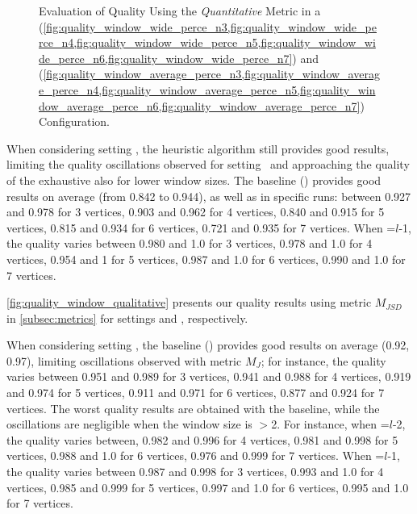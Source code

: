 \begin{figure}[H]
\begin{adjustbox}{minipage=\linewidth,scale=0.75}
\begin{subfigure}{0.45\textwidth}
        \end{subfigure}

        \caption{Evaluation of Quality Using the \emph{Quantitative} Metric in a \wide (\cref{fig:quality_window_wide_perce_n3,fig:quality_window_wide_perce_n4,fig:quality_window_wide_perce_n5,fig:quality_window_wide_perce_n6,fig:quality_window_wide_perce_n7}) and \average (\cref{fig:quality_window_average_perce_n3,fig:quality_window_average_perce_n4,fig:quality_window_average_perce_n5,fig:quality_window_average_perce_n6,fig:quality_window_average_perce_n7}) Configuration.}  \label{fig:quality_window_perce}
      \end{adjustbox}
    \end{figure}

    When considering setting \average, the heuristic algorithm still provides good results, limiting the quality oscillations observed for setting \wide\ and approaching the quality of the exhaustive also for lower window sizes. The baseline () provides good results on average (from 0.842 to 0.944), as well as in specific runs: between 0.927 and 0.978 for 3 vertices, 0.903 and 0.962 for 4 vertices, 0.840 and 0.915 for 5 vertices, 0.815 and 0.934 for 6 vertices, 0.721 and 0.935 for 7 vertices.
    When \windowsize=$l$-1, the quality varies between 0.980 and 1.0 for 3 vertices, 0.978 and 1.0 for 4 vertices, 0.954 and 1 for 5 vertices, 0.987 and 1.0 for 6 vertices, 0.990 and 1.0 for 7 vertices.

    \cref{fig:quality_window_qualitative} {\color{OurColor2}presents} our quality results using metric $M_{JSD}$ in \cref{subsec:metrics} for settings \wide and \average, respectively.

    When considering setting \wide, the baseline () provides good results on average (0.92, 0.97), limiting oscillations observed with metric $M_J$; for instance, the quality varies between 0.951 and 0.989 for 3 vertices, 0.941 and 0.988 for 4 vertices, 0.919 and 0.974 for 5 vertices, 0.911 and 0.971 for 6 vertices, 0.877 and 0.924 for 7 vertices.
    The worst quality results are obtained with the baseline, while the oscillations are negligible when the window size is $>$2. For instance, when \windowsize=$l$-2, the quality varies between, 0.982 and 0.996 for 4 vertices, 0.981 and 0.998 for 5 vertices, 0.988 and 1.0 for 6 vertices, 0.976 and 0.999 for 7 vertices. When \windowsize=$l$-1, the quality varies between  0.987 and  0.998 for 3 vertices, 0.993 and 1.0 for 4 vertices, 0.985 and 0.999 for 5 vertices, 0.997 and 1.0 for 6 vertices, 0.995 and 1.0  for 7 vertices.

